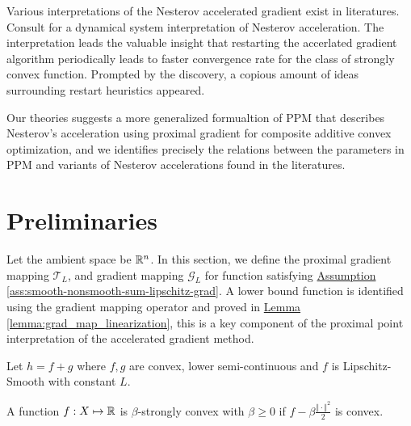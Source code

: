 \documentclass[12pt]{article}
\begin{document}
    \par
    Various interpretations of the Nesterov accelerated gradient exist in literatures. 
    Consult \cite{su_differential_2015} for a dynamical system interpretation of Nesterov acceleration. 
    The interpretation leads the valuable insight that restarting the accerlated gradient algorithm periodically leads to faster convergence rate for the class of strongly convex function. 
    Prompted by the discovery, a copious amount of ideas surrounding restart heuristics appeared. 

    Our theories suggests a more generalized formualtion of PPM that describes Nesterov's acceleration using proximal gradient for composite additive convex optimization, and we identifies precisely the relations between the parameters in PPM and variants of Nesterov accelerations found in the literatures. 

    
\section{Preliminaries}\label{sec:preliminaries}
    Let the ambient space be $\mathbb R^n$. 
    In this section, we define the proximal gradient mapping $\mathcal T_L$, and gradient mapping $\mathcal G_L$ for function satisfying 
    \hyperref[ass:smooth-nonsmooth-sum-lipschitz-grad]
    {Assumption \ref*{ass:smooth-nonsmooth-sum-lipschitz-grad}}. 
    A lower bound function is identified using the gradient mapping operator and proved in
    \hyperref[lemma:grad_map_linearization]{Lemma \ref*{lemma:grad_map_linearization}}, 
    this is a key component of the proximal point interpretation of the accelerated gradient method. 
    \begin{assumption}\label{ass:smooth-nonsmooth-sum-lipschitz-grad}
        Let $h = f + g$ where $f, g$ are convex, lower semi-continuous and $f$ is Lipschitz-Smooth with constant $L$. 
    \end{assumption}
    \begin{definition}
        A function $f: X \mapsto \mathbb R$ is $\beta$-strongly convex
        with $\beta\geq 0$ if $f - \beta \frac{\Vert \cdot\Vert^2}{2}$ is convex.
    \end{definition}
\end{document}
